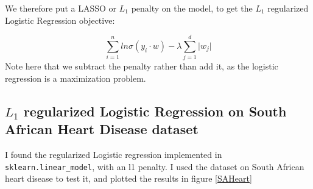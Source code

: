 \documentclass[%
 reprint,
 amsmath,amssymb,
 aps,
]{revtex4-1}
\begin{document}
We therefore put a LASSO or $L_1$ penalty on the model, to get the $L_1$ regularized Logistic Regression objective:

\[
\sum_{i=1}^{n}ln \sigma(y_i\cdot w) - \lambda \sum_{j=1}^d \lvert w_j\rvert
\]
Note here that we subtract the penalty rather than add it, as the logistic regression is a maximization problem.


\subsection{$L_1$ regularized Logistic Regression on South African Heart Disease dataset}

I found the regularized Logistic regression implemented in \verb!sklearn.linear_model!, with an l1 penalty.
I used the dataset on South African heart disease\cite{hastie_elements_2017} to test it, and plotted the results in figure \ref{SAHeart}
\end{document}
